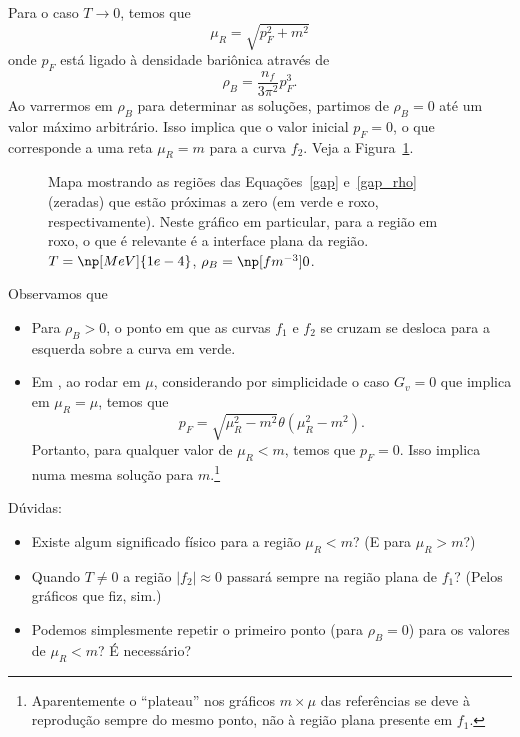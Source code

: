Para o caso $T \to 0$, temos que 
\begin{equation}
	\mu_R = \sqrt{p_F^2 + m^2}
\end{equation}
%
onde $p_F$ está ligado à densidade bariônica através de
\begin{equation}
	\rho_B = \frac{n_f}{3\pi^2}p_F^3.
\end{equation}
%
Ao varrermos em $\rho_B$ para determinar as soluções, partimos de $\rho_B = 0$ até um valor máximo arbitrário. Isso implica que o valor inicial $p_F = 0$, o que corresponde a uma reta $\mu_R = m$ para a curva $f_2$. Veja a Figura~\ref{Fig:Map_zero_temp_zero_dens}.

\begin{figure}
	
	\caption{Mapa mostrando as regiões das Equações~\ref{gap} e~\ref{gap_rho} (zeradas) que estão próximas a zero (em verde e roxo, respectivamente).  Neste gráfico em particular, para a região em roxo, o que é relevante é a interface plana da região. $T = \np[MeV]{1e-4}$, $\rho_B = \np[fm^{-3}]{0}$.\protect}
	\label{Fig:Map_zero_temp_zero_dens}
\end{figure}

Observamos que
\begin{itemize}
	\item Para $\rho_B > 0$, o ponto em que as curvas $f_1$ e $f_2$ se cruzam se desloca para a esquerda sobre a curva em verde.
	\item Em \textcite{Buballa1996}, ao rodar em $\mu$, considerando por simplicidade o caso $G_v = 0$ que implica em $\mu_R = \mu$, temos que
		\begin{equation}
			p_F = \sqrt{\mu_R^2 - m^2}\theta(\mu_R^2 - m^2).
		\end{equation}
		Portanto, para qualquer valor de $\mu_R < m$, temos que $p_F = 0$. Isso implica numa mesma solução para $m$.\footnote{Aparentemente o ``plateau'' nos gráficos $m \times \mu$ das referências se deve à reprodução sempre do mesmo ponto, não à região plana presente em $f_1$.}
\end{itemize}

Dúvidas:
\begin{itemize}
	\item Existe algum significado físico para a região $\mu_R < m$? (E para $\mu_R > m$?)
	\item Quando $T \neq 0$ a região $|f_2| \approx 0$ passará sempre na região plana de $f_1$? (Pelos gráficos que fiz, sim.)
	\item Podemos simplesmente repetir o primeiro ponto (para $\rho_B = 0$) para os valores de $\mu_R < m$? É necessário?
\end{itemize}

